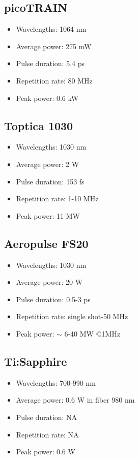 \documentclass[11pt, headings=optiontoheadandtoc]{article}
\begin{document}
\subsection*{picoTRAIN}
\begin{itemize}
    \item Wavelengths: 1064 nm
    \item Average power: 275 mW
    \item Pulse duration: 5.4 ps
    \item Repetition rate: 80 MHz
    \item Peak power: 0.6 kW
\end{itemize}
\subsection*{Toptica 1030}
\begin{itemize}
    \item Wavelengths: 1030 nm
    \item Average power: 2 W
    \item Pulse duration: 153 fs
    \item Repetition rate: 1-10 MHz
    \item Peak power: 11 MW
\end{itemize}
\subsection*{Aeropulse FS20}
\begin{itemize}
    \item Wavelengths: 1030 nm
    \item Average power: 20 W
    \item Pulse duration: 0.5-3 ps
    \item Repetition rate: single shot-50 MHz
    \item Peak power: $\sim$ 6-40 MW @1MHz
\end{itemize}
\subsection*{Ti:Sapphire}
\begin{itemize}
    \item Wavelengths: 700-990 nm
    \item Average power: 0.6 W in fiber \@980 nm
    \item Pulse duration: NA
    \item Repetition rate: NA
    \item Peak power: 0.6 W
\end{itemize}
\newpage
\end{document}
